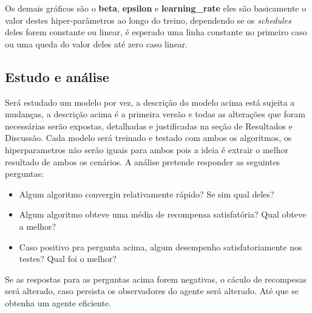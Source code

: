 Os demais gráficos são o \textbf{beta}, \textbf{epsilon} e \textbf{learning\_rate} eles são basicamente o valor destes hiper-parâmetros ao longo do treino, dependendo se os \textit{schedules} deles forem constante ou linear, é esperado uma linha constante no primeiro caso ou uma queda do valor deles até zero caso linear.

\subsection{Estudo e análise}
Será estudado um modelo por vez, a descrição do modelo acima está sujeita a mudanças, a descrição acima é a primeira versão e todas as alterações que foram necessárias serão expostas, detalhadas e justificadas na seção de Resultados e Discussão. Cada modelo será treinado e testado com ambos os algoritmos, os hiperparametros não serão iguais para ambos pois a ideia é extrair o melhor resultado de ambos os cenários. A análise pretende responder as seguintes perguntas:

\begin{itemize}
   \item Algum algoritmo convergiu relativamente rápido? Se sim qual deles?
   \item Algum algoritmo obteve uma média de recompensa satisfatória? Qual obteve a melhor?
   \item Caso positivo pra pergunta acima, algum desempenho satisfatoriamente nos testes? Qual foi o melhor?
\end{itemize}

Se as respostas para as perguntas acima forem negativas, o cáculo de recompesas será alterado, caso persista os observadores do agente será alterado. Até que se obtenha um agente eficiente.

 